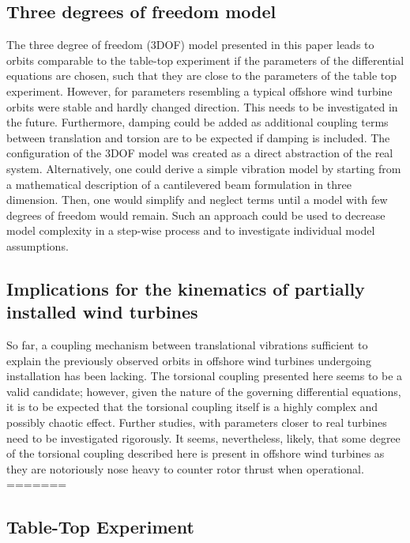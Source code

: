 \documentclass{article}
\begin{document}
\subsection{Three degrees of freedom model}

The three degree of freedom (3DOF) model presented in this paper leads to orbits comparable to the table-top experiment if the parameters of the differential equations are chosen, such that they are close to the parameters of the table top experiment. However, for parameters resembling a typical offshore wind turbine orbits were stable and  hardly changed direction. This needs to be investigated in the future. Furthermore, damping could be added as additional coupling terms between translation and torsion are to be expected if damping is included. The configuration of the 3DOF model was created as a direct abstraction of the real system. Alternatively, one could derive a simple vibration model by starting from a mathematical description of a cantilevered beam formulation in three dimension. Then, one would simplify and neglect terms until a model with few degrees of freedom would remain. Such an approach could be used to decrease model complexity in a step-wise process and to investigate individual model assumptions.

\subsection{Implications for the kinematics of partially installed wind turbines}

So far, a coupling mechanism between translational vibrations sufficient to explain the previously observed orbits in offshore wind turbines undergoing installation has been lacking. The torsional coupling presented here seems to be a valid candidate; however, given the nature of the governing differential equations, it is to be expected that the torsional coupling itself is a highly complex and possibly chaotic effect. Further studies, with parameters closer to real turbines need to be investigated rigorously. It seems, nevertheless, likely, that some degree of the torsional coupling described here is present in offshore wind turbines as they are notoriously nose heavy to counter rotor thrust when operational. 
=======
\subsection{Table-Top Experiment}
\end{document}
